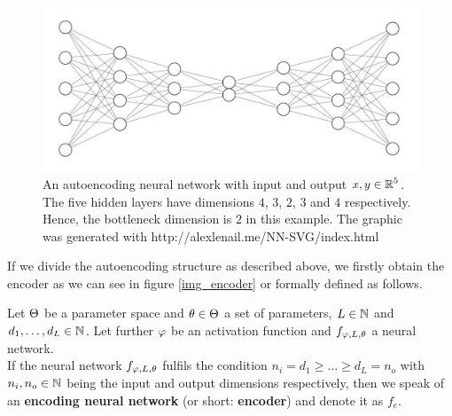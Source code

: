 \begin{figure}
\begin{center}
   \begin{minipage}[b]{0.9\linewidth}
      \includegraphics[width=\linewidth]{autoencoder}
      \caption{An autoencoding neural network with input and output $x, y\in \operatorname{\mathbb{R}}^5$. The five hidden layers have dimensions $4$, $3$, $2$, $3$ and $4$ respectively. Hence, the bottleneck dimension is $2$ in this example. The graphic was generated with http://alexlenail.me/NN-SVG/index.html}\label{autoencoder}
	\end{minipage}
\end{center}
\end{figure}


If we divide the autoencoding structure as described above, we firstly obtain the encoder as we can see in figure \ref{img_encoder} or formally defined as follows.

\begin{definition}\label{def_encoder}
Let $\operatorname{\Theta}$ be a parameter space and $\theta \in \operatorname{\Theta}$ a set of parameters, $L\in \operatorname{\mathbb{N}}$ and $d_1,\ldots, d_L\in\operatorname{\mathbb{N}}$. Let further $\operatorname{\varphi}$ be an activation function and $f_{\operatorname{\varphi},L,\theta}$ a neural network.\\
If the neural network $f_{\operatorname{\varphi},L,\theta}$ fulfils the condition $n_i= d_1 \geq \ldots \geq d_L = n_o$ with $n_i, n_o \in \operatorname{\mathbb{N}}$ being the input and output dimensions respectively, then we speak of an \textbf{encoding neural network} (or short: \textbf{encoder}) and denote it as $f_e$.
\end{definition}


